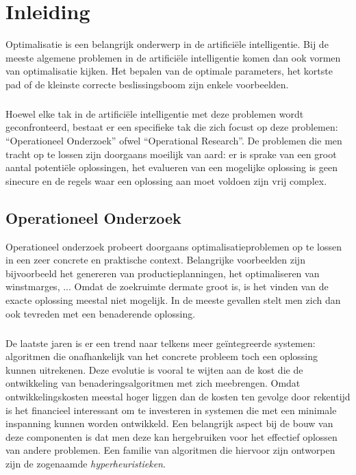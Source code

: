 \chapter{Inleiding}

Optimalisatie is een belangrijk onderwerp in de artifici\"ele intelligentie. Bij de meeste algemene problemen in de artifici\"ele intelligentie komen dan ook vormen van optimalisatie kijken. Het bepalen van de optimale parameters, het kortste pad of de kleinste correcte beslissingsboom zijn enkele voorbeelden.

\paragraph{}
Hoewel elke tak in de artifici\"ele intelligentie met deze problemen wordt geconfronteerd, bestaat er een specifieke tak die zich focust op deze problemen: ``Operationeel Onderzoek'' ofwel ``Operational Research''. De problemen die men tracht op te lossen zijn doorgaans moeilijk van aard: er is sprake van een groot aantal potenti\"ele oplossingen, het evalueren van een mogelijke oplossing is geen sinecure en de regels waar een oplossing aan moet voldoen zijn vrij complex.

\section{Operationeel Onderzoek}

Operationeel onderzoek probeert doorgaans optimalisatieproblemen op te lossen in een zeer concrete en praktische context. Belangrijke voorbeelden zijn bijvoorbeeld het genereren van productieplanningen, het optimaliseren van winstmarges, ... Omdat de zoekruimte dermate groot is, is het vinden van de exacte oplossing meestal niet mogelijk. In de meeste gevallen stelt men zich dan ook tevreden met een benaderende oplossing.

\paragraph{}
De laatste jaren is er een trend naar telkens meer ge\"integreerde systemen: algoritmen die onafhankelijk van het concrete probleem toch een oplossing kunnen uitrekenen. Deze evolutie is vooral te wijten aan de kost die de ontwikkeling van benaderingsalgoritmen met zich meebrengen. Omdat ontwikkelingskosten meestal hoger liggen dan de kosten ten gevolge door rekentijd is het financieel interessant om te investeren in systemen die met een minimale inspanning kunnen worden ontwikkeld. Een belangrijk aspect bij de bouw van deze componenten is dat men deze kan hergebruiken voor het effectief oplossen van andere problemen. Een familie van algoritmen die hiervoor zijn ontworpen zijn de zogenaamde \emph{hyperheuristieken}.

